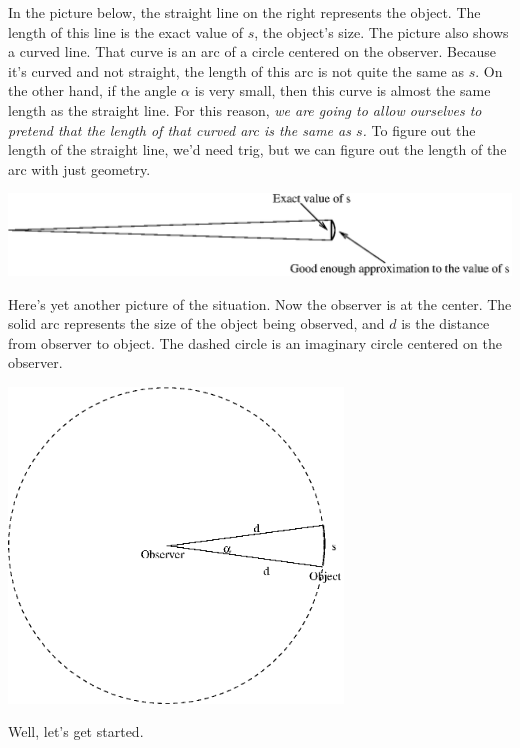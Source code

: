 In the picture below, the straight line on the right
represents the
object.  The length of this line is the exact value of $s$, the object's
size.  The picture also shows a curved line.  That curve is an arc
of a circle centered on the observer.  Because it's curved and not straight,
the length of this arc is not quite the same as $s$.  On the other hand,
if the angle $\alpha$ is very small, then this curve is almost the same
length as the straight line.  For this reason, {\it we are going to allow
ourselves to pretend that the length of that curved arc is the
same as $s$.}  To figure out the length of the straight line, we'd
need trig, but we can figure out the length of the arc with just
geometry.


\medskip
\centerline{\includegraphics[width=6in]{angularsize/angularsizefig2.eps}}
\medskip

\pagebreak[4]
Here's yet another picture of the situation.  Now the observer is at
the center.  The solid arc represents the size of the object being observed,
and $d$ is the distance from observer to object.  The dashed circle
is an imaginary circle centered on the observer.

\medskip
\centerline{\includegraphics[width=3.5in]{angularsize/angularsizefig3.eps}}
\medskip

Well, let's get started.



